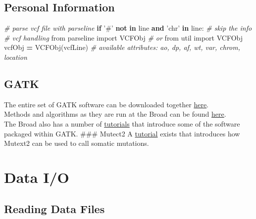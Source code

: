 \documentclass[]{book}
\newenvironment{Shaded}{\begin{snugshade}}{\end{snugshade}}
\newcommand{\CommentTok}[1]{\textcolor[rgb]{0.56,0.35,0.01}{\textit{#1}}}
\newcommand{\ControlFlowTok}[1]{\textcolor[rgb]{0.13,0.29,0.53}{\textbf{#1}}}
\newcommand{\ImportTok}[1]{#1}
\newcommand{\KeywordTok}[1]{\textcolor[rgb]{0.13,0.29,0.53}{\textbf{#1}}}
\newcommand{\NormalTok}[1]{#1}
\newcommand{\OperatorTok}[1]{\textcolor[rgb]{0.81,0.36,0.00}{\textbf{#1}}}
\newcommand{\StringTok}[1]{\textcolor[rgb]{0.31,0.60,0.02}{#1}}
\begin{document}
\hypertarget{personal-information}{%
\section{Personal Information}\label{personal-information}}

\begin{Shaded}
\begin{Highlighting}[]
\CommentTok{# parse vcf file with parseline}
\ControlFlowTok{if} \StringTok{'#'} \KeywordTok{not} \KeywordTok{in}\NormalTok{ line }\KeywordTok{and} \StringTok{'chr'} \KeywordTok{in}\NormalTok{ line: }\CommentTok{# skip the info}
\CommentTok{# vcf handling}
\ImportTok{from}\NormalTok{ parseline }\ImportTok{import}\NormalTok{ VCFObj}
\CommentTok{# or}
\ImportTok{from}\NormalTok{ util }\ImportTok{import}\NormalTok{ VCFObj}
\NormalTok{vcfObj }\OperatorTok{=}\NormalTok{ VCFObj(vcfLine)}
\CommentTok{# available attributes: ao, dp, af, wt, var, chrom, location}
\end{Highlighting}
\end{Shaded}

\hypertarget{gatk}{%
\section{GATK}\label{gatk}}

The entire set of GATK software can be downloaded together \href{'https://software.broadinstitute.org/gatk/'}{here}.\\
Methods and algorithms as they are run at the Broad can be found \href{'https://software.broadinstitute.org/gatk/documentation/topic?name=methods'}{here}.\\
The Broad also has a number of \href{'https://software.broadinstitute.org/gatk/documentation/topic?name=tutorials'}{tutorials} that introduce some of the software packaged within GATK.
\#\#\# Mutect2
A \href{'https://software.broadinstitute.org/gatk/documentation/article?id=24057'}{tutorial} exists that introduces how Mutext2 can be used to call somatic mutations.

\hypertarget{io}{%
\chapter{Data I/O}\label{io}}

\hypertarget{reading-data-files}{%
\section{Reading Data Files}\label{reading-data-files}}
\end{document}
